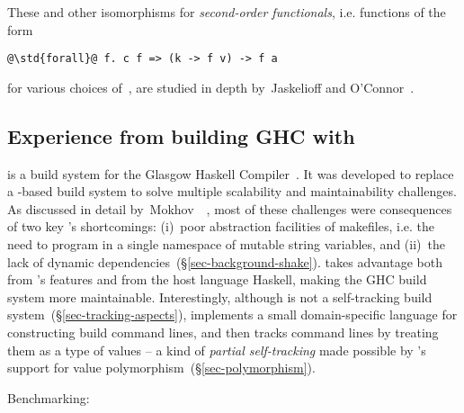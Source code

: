 These and other isomorphisms for \emph{second-order functionals}, i.e.
functions of the form

\vspace{1mm}
\begin{center}
\begin{minipage}{0.5\textwidth}
\begin{verbatim}
@\std{forall}@ f. c f => (k -> f v) -> f a
\end{verbatim}
\end{minipage}
\end{center}
\vspace{1mm}

for various choices of~, are studied in depth by~Jaskelioff and
O’Connor~.

\subsection{Experience from building GHC with \Shake}

\Hadrian is a build system for the Glasgow Haskell Compiler~\cite{ghc}. It was
developed to replace a \Make-based build system to solve multiple scalability
and maintainability challenges. As discussed in detail
by~Mokhov~\etal~, most of these challenges were consequences
of two key \Make's shortcomings: (i)~poor abstraction facilities of makefiles,
i.e. the need to program in a single namespace of mutable string variables, and
(ii)~the lack of dynamic dependencies~(\S\ref{sec-background-shake}).
\Hadrian takes advantage both from \Shake's features and from the host language
Haskell, making the GHC build system more maintainable. Interestingly, although
\Shake is not a self-tracking build system~(\S\ref{sec-tracking-aspects}),
\Hadrian implements a small domain-specific language for constructing build
command lines, and then tracks command lines by treating them as a type of
values -- a kind of \emph{partial self-tracking} made possible by \Shake's
support for value polymorphism~(\S\ref{sec-polymorphism}).


Benchmarking:

